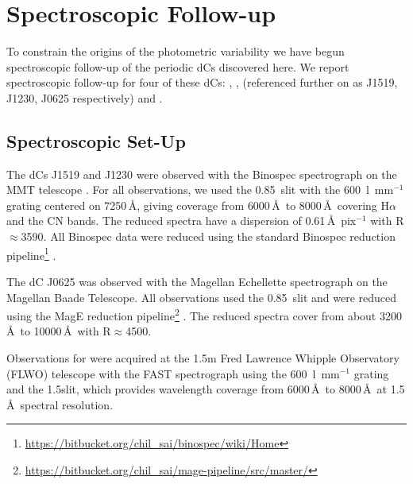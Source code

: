 \documentclass[twocolumn]{aastex631}
\begin{document}
\section{Spectroscopic Follow-up}\label{sec:rvs}

To constrain the origins of the photometric variability we have begun spectroscopic follow-up of the periodic dCs discovered here. We report spectroscopic follow-up for four of these dCs: , ,  (referenced further on as J1519, J1230, J0625 respectively) and .%

\subsection{Spectroscopic Set-Up}\label{subsec:spec_setup}

The dCs J1519 and J1230 were observed with the Binospec spectrograph on the MMT telescope \citep{Fabricant2019}. For all observations, we used the 0.85\arcsec\ slit with the 600~l~mm$^{-1}$ grating centered on 7250\,\AA, giving coverage from $6000$\,\AA\ to $8000$\,\AA\ covering H$\alpha$ and the CN bands. The reduced spectra have a dispersion of 0.61\,\AA~pix$^{-1}$ with R$\approx$3590. All Binospec data were reduced using the standard Binospec reduction pipeline\footnote{\href{https://bitbucket.org/chil\_sai/binospec/wiki/Home}{https://bitbucket.org/chil\_sai/binospec/wiki/Home}} \citep{Binospec_reduc}.

 
The dC J0625 was observed with the Magellan Echellette \citep[MagE;][]{MagE} spectrograph on the Magellan Baade Telescope. All observations used the 0.85\arcsec\ slit and were reduced using the MagE reduction pipeline\footnote{\href{https://bitbucket.org/chil\_sai/mage-pipeline/src/master/}{https://bitbucket.org/chil\_sai/mage-pipeline/src/master/}} \citep{MagE_reduc}. The reduced spectra cover from about 3200\,\AA\ to 10000\,\AA\ with R$\approx$4500.



Observations for  were acquired at the 1.5m Fred Lawrence Whipple Observatory (FLWO) telescope with the FAST spectrograph \citep{FAST}  using the 600~l~mm$^{-1}$ grating and the 1.5\arcsec slit, which provides wavelength coverage from 6000\,\AA\ to 8000\,\AA\ at 1.5\,\AA\ spectral resolution. 
\end{document}
